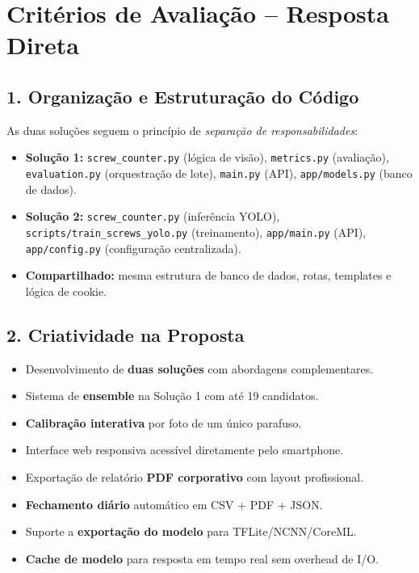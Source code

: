 \documentclass[12pt,a4paper]{article}
\begin{document}
\section{Crit\'erios de Avalia\c{c}\~ao -- Resposta Direta}

\subsection{1. Organiza\c{c}\~ao e Estrutura\c{c}\~ao do C\'odigo}

As duas solu\c{c}\~oes seguem o princ\'ipio de \emph{separa\c{c}\~ao de
responsabilidades}:

\begin{itemize}[leftmargin=*]
  \item \textbf{Solu\c{c}\~ao 1:} \texttt{screw\_counter.py} (l\'ogica de vis\~ao),
        \texttt{metrics.py} (avalia\c{c}\~ao), \texttt{evaluation.py} (orquestra\c{c}\~ao
        de lote), \texttt{main.py} (API), \texttt{app/models.py} (banco de dados).
  \item \textbf{Solu\c{c}\~ao 2:} \texttt{screw\_counter.py} (infer\^encia YOLO),
        \texttt{scripts/train\_screws\_yolo.py} (treinamento), \texttt{app/main.py}
        (API), \texttt{app/config.py} (configura\c{c}\~ao centralizada).
  \item \textbf{Compartilhado:} mesma estrutura de banco de dados, rotas, templates
        e l\'ogica de cookie.
\end{itemize}

\subsection{2. Criatividade na Proposta}

\begin{itemize}[leftmargin=*]
  \item Desenvolvimento de \textbf{duas solu\c{c}\~oes} com abordagens complementares.
  \item Sistema de \textbf{ensemble} na Solu\c{c}\~ao 1 com at\'e 19 candidatos.
  \item \textbf{Calibra\c{c}\~ao interativa} por foto de um \'unico parafuso.
  \item Interface web responsiva acess\'ivel diretamente pelo smartphone.
  \item Exporta\c{c}\~ao de relat\'orio \textbf{PDF corporativo} com layout profissional.
  \item \textbf{Fechamento di\'ario} autom\'atico em CSV + PDF + JSON.
  \item Suporte a \textbf{exporta\c{c}\~ao do modelo} para TFLite/NCNN/CoreML.
  \item \textbf{Cache de modelo} para resposta em tempo real sem overhead de I/O.
\end{itemize}
\end{document}
